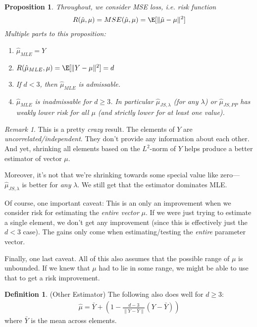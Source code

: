 \documentclass[12pt]{article}
\theoremstyle{plain}
\newtheorem{prop}[thm]{Proposition}
\theoremstyle{definition}
\newtheorem{defn}[thm]{Definition}
\theoremstyle{remark}
\newtheorem*{rmk}{Remark}
\begin{document}
\begin{prop}
Throughout, we consider MSE loss, i.e. risk function
\begin{align*}
  R(\hat{\mu},\mu)
  = MSE(\hat{\mu},\mu)
  =\E[\lVert\hat{\mu}-\mu\rVert^2]
\end{align*}
Multiple parts to this proposition:
\begin{enumerate}[label=\emph{(\roman*)}]
  \item $\hat{\mu}_{MLE}=Y$
  \item $R(\hat{\mu}_{MLE},\mu)=\E[\lVert Y-\mu\rVert^2]=d$
  \item If $d<3$, then $\hat{\mu}_{MLE}$ is admissable.
  \item $\hat{\mu}_{MLE}$ is \emph{inadmissable} for $d\geq 3$.
    In particular $\hat{\mu}_{JS,\lambda}$ (for any $\lambda$) or
    $\hat{\mu}_{JS,PP}$ has weakly lower risk for all $\mu$ (and
    strictly lower for at least one value).
\end{enumerate}
\end{prop}
\begin{rmk}
This is a pretty \emph{crazy} result. The elements of $Y$ are
\emph{uncorrelated/independent}. They don't provide any information
about each other. And yet, shrinking all elements based on the
$L^2$-norm of $Y$ helps produce a better estimator of vector $\mu$.

Moreover, it's not that we're shrinking towards some special value
like zero---$\hat{\mu}_{JS,\lambda}$ is better for \emph{any} $\lambda$.
We still get that the estimator dominates MLE.

Of course, one important caveat: This is an only an improvement when we
consider risk for estimating the \emph{entire vector} $\mu$.
If we were just trying to estimate a single element, we don't get any
improvement (since this is effectively just the $d<3$ case).
The gains only come when estimating/testing the \emph{entire} parameter
vector.

Finally, one last caveat. All of this also assumes that the possible
range of $\mu$ is unbounded. If we knew that $\mu$ had to lie in some
range, we might be able to use that to get a risk improvement.
\end{rmk}

\begin{defn}(Other Estimator)
The following also does well for $d\geq 3$:
\begin{align*}
  \hat{\mu}
  =
  \bar{Y}
  +
  \left(
  1-
  \frac{d-3}{\lVert Y-\bar{Y}\rVert}
  (Y-\bar{Y})
  \right)
\end{align*}
where $\bar{Y}$ is the mean across elements.
\end{defn}
\end{document}
